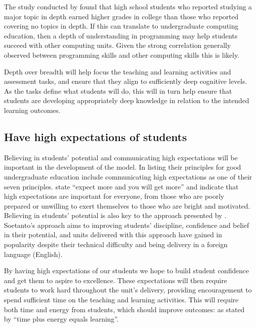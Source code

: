The study conducted by \citet{Schwartz:2009} found that high school students who reported studying a major topic in depth earned higher grades in college than those who reported covering no topics in depth. If this can translate to undergraduate computing education, then a depth of understanding in programming may help students succeed with other computing units. Given the strong correlation generally observed between programming skills and other computing skills \cite{McGettrick:2005} this is likely.

Depth over breadth will help focus the teaching and learning activities and assessment tasks, and ensure that they align to sufficiently deep cognitive levels. As the tasks define what students will do, this will in turn help ensure that students are developing appropriately deep knowledge in relation to the intended learning outcomes.


\subsection{Have high expectations of students} %
\label{ssub:have_high_expectations_of_students_}

Believing in students' potential and communicating high expectations will be important in the development of the model. In listing their principles for good undergraduate education \citet{Chickering:1987} include communicating high expectations as one of their seven principles. \citet{Chickering:1987} state ``expect more and you will get more'' and indicate that high expectations are important for everyone, from those who are poorly prepared or unwilling to exert themselves to those who are bright and motivated. Believing in students' potential is also key to the approach presented by \citet{Soetanto:2003,Soetanto:2012}. Soetanto's approach aims to improving students' discipline, confidence and belief in their potential, and units delivered with this approach have gained in popularity despite their technical difficulty and being delivery in a foreign language (English).

By having high expectations of our students we hope to build student confidence and get them to aspire to excellence. These expectations will then require students to work hard throughout the unit's delivery, providing encouragement to spend sufficient time on the teaching and learning activities. This will require both time and energy from students, which should improve outcomes: as stated by \citet{Chickering:1987} ``time plus energy equals learning''.

